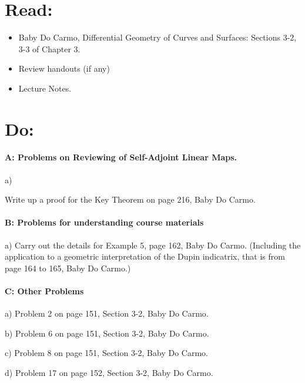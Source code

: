\documentclass[12pt]{article}
\title{\rightline {\Huge {}}}
\author{\LARGE {HMC\quad Math 142 \quad Fall 2026} 
\\ {Prof. Gu}  
\\ {\LARGE Problem Set 7}}
\date{Start this assignment as soon as possible!}
\begin{document}
\maketitle

\section*{ Read: }

\begin{itemize}
	\item{Baby Do Carmo, Differential Geometry
		      of Curves and Surfaces:
		      Sections 3-2, 3-3 of Chapter 3.}
	\item{ Review handouts (if any)}
	\item{Lecture Notes.}
\end{itemize}

\section*{ Do: }
\paragraph{A: Problems on Reviewing of Self-Adjoint Linear Maps.}
\begin{itemize}
	{\item a) } Write up a proof for the Key Theorem on page 216, Baby Do
	Carmo.

\end{itemize}

\medskip
\paragraph{B: Problems for understanding course materials}

\begin{itemize}
	{\item a) Carry out the details for Example 5, page 162, Baby Do
		Carmo.  (Including the application to a geometric interpretation
		of the Dupin indicatrix, that is from page 164 to 165, Baby Do Carmo.)}
\end{itemize}

\paragraph{C: Other Problems}
\begin{itemize}

	{\item a) Problem 2 on page 151, Section 3-2, Baby Do Carmo.}
	{\item b) Problem 6 on page 151, Section 3-2, Baby Do Carmo.}
	{\item c) Problem 8 on page 151, Section 3-2, Baby Do Carmo.}
	{\item d) Problem 17 on page 152, Section 3-2, Baby Do Carmo.}

\end{itemize}
\end{document}
